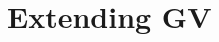 \documentclass[oribibl,orivec,envcountsame]{llncs}
\begin{document}




\section{Extending GV}\label{sec:extend}
\end{document}
